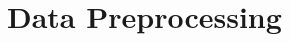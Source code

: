 \documentclass[
 size=14pt,
 paper=smartboard,  %
 mode=present, 		%
 display=slides, 	%
 style=tuliplab,  	%
 pauseslide,
 fleqn,leqno]{powerdot}
\begin{document}










\section{Data Preprocessing}
\end{document}
